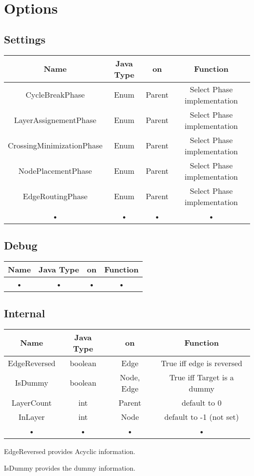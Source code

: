 \section{Options}

\subsection{Settings}
\begin{tabular}{|c|c|c|c|}
\hline 
Name & Java Type & on & Function \\ 
\hline 
CycleBreakPhase & Enum & Parent & Select Phase implementation \\ 
\hline 
LayerAssignementPhase & Enum & Parent & Select Phase implementation \\ 
\hline 
CrossingMinimizationPhase & Enum & Parent & Select Phase implementation \\ 
\hline 
NodePlacementPhase & Enum & Parent & Select Phase implementation \\ 
\hline 
EdgeRoutingPhase & Enum & Parent & Select Phase implementation \\ 
\hline 
• & • & • & • \\ 
\hline 
\end{tabular} 

\subsection{Debug}
\begin{tabular}{|c|c|c|c|}
\hline 
Name & Java Type & on & Function \\ 
\hline 
• & • & • & • \\ 
\hline 
\end{tabular} 

\subsection{Internal}
\begin{tabular}{|c|c|c|c|}
\hline 
Name & Java Type & on & Function \\  
\hline 
EdgeReversed & boolean & Edge & True iff edge is reversed \\ 
\hline 
IsDummy & boolean & Node, Edge & True iff Target is a dummy \\ 
\hline 
LayerCount & int & Parent & default to 0 \\ 
\hline 
InLayer & int & Node & default to -1 (not set) \\ 
\hline 
• & • & • & • \\ 
\hline 
\end{tabular} 


EdgeReversed provides Acyclic information.

IsDummy provides the dummy information.